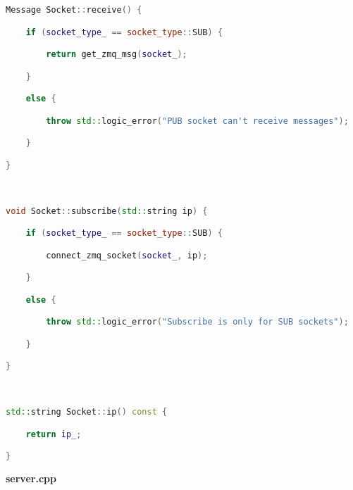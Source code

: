 \begin{lstlisting}[language=C++]
Message Socket::receive() {

    if (socket_type_ == socket_type::SUB) {

        return get_zmq_msg(socket_);

    } 

    else {

        throw std::logic_error("PUB socket can't receive messages");

    }

}



void Socket::subscribe(std::string ip) {

    if (socket_type_ == socket_type::SUB) {

        connect_zmq_socket(socket_, ip);

    } 

    else {

        throw std::logic_error("Subscribe is only for SUB sockets");

    }

}



std::string Socket::ip() const {

    return ip_;

}

\end{lstlisting}

\textbf{server.cpp}

